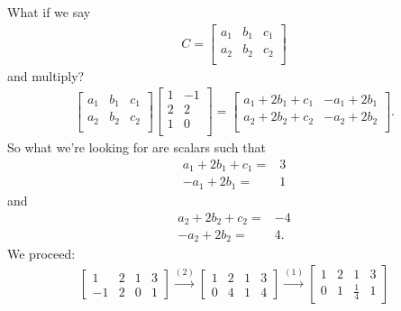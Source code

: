 \documentclass[12pt]{article}
\begin{document}
\begin{enumerate}
    What if we say
    \begin{align*}
      C =
      \begin{bmatrix}
        a_1 & b_1 & c_1\\
        a_2 & b_2 & c_2\\
      \end{bmatrix}
    \end{align*}
    and multiply?
    \begin{align*}
      \begin{bmatrix}
        a_1 & b_1 & c_1\\
        a_2 & b_2 & c_2\\
      \end{bmatrix}
      \begin{bmatrix}
        1 & -1\\
        2 &  2\\
        1 &  0\\
      \end{bmatrix}
      =
      \begin{bmatrix}
        a_1 + 2b_1 + c_1 & -a_1 + 2b_1\\
        a_2 + 2b_2 + c_2 & -a_2 + 2b_2\\
      \end{bmatrix}.
    \end{align*}
    So what we're looking for are scalars such that
    \begin{align*}
      a_1 + 2b_1 + c_1 =& 3\\
      -a_1 + 2b_1 =& 1
    \end{align*}
    and
    \begin{align*}
      a_2 + 2b_2 + c_2 =& -4\\
      -a_2 + 2b_2 =& 4.
    \end{align*}
    We proceed:
    \begin{align*}
      \begin{bmatrix}
        1  & 2 & 1 & 3\\
        -1 & 2 & 0 & 1
      \end{bmatrix}
      \xrightarrow{(2)}
      \begin{bmatrix}
        1 & 2 & 1 & 3\\
        0 & 4 & 1 & 4
      \end{bmatrix}
      \xrightarrow{(1)}
      \begin{bmatrix}
        1 & 2 & 1           & 3\\
        0 & 1 & \frac{1}{4} & 1
      \end{bmatrix}

\end{align*}
\end{enumerate}
\end{document}
